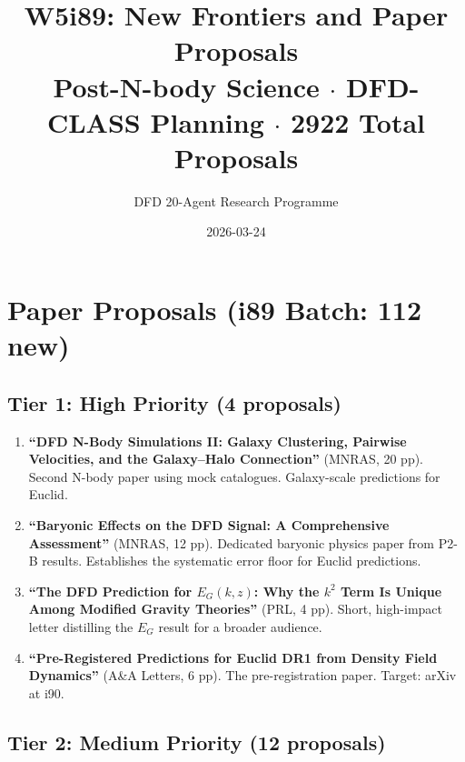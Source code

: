 \documentclass[11pt,a4paper]{article}
\title{W5i89: New Frontiers and Paper Proposals\\[6pt]
\large Post-N-body Science $\cdot$ DFD-CLASS Planning $\cdot$ 2922 Total Proposals}
\author{DFD 20-Agent Research Programme}
\date{2026-03-24}
\begin{document}
\maketitle

\section{Paper Proposals (i89 Batch: 112 new)}

\subsection{Tier 1: High Priority (4 proposals)}

\begin{enumerate}[nosep]
\item \textbf{``DFD N-Body Simulations II: Galaxy Clustering, Pairwise Velocities, and the Galaxy--Halo Connection''} (MNRAS, 20 pp). Second N-body paper using mock catalogues. Galaxy-scale predictions for Euclid.

\item \textbf{``Baryonic Effects on the DFD Signal: A Comprehensive Assessment''} (MNRAS, 12 pp). Dedicated baryonic physics paper from P2-B results. Establishes the systematic error floor for Euclid predictions.

\item \textbf{``The DFD Prediction for $E_G(k,z)$: Why the $k^2$ Term Is Unique Among Modified Gravity Theories''} (PRL, 4 pp). Short, high-impact letter distilling the $E_G$ result for a broader audience.

\item \textbf{``Pre-Registered Predictions for Euclid DR1 from Density Field Dynamics''} (A\&A Letters, 6 pp). The pre-registration paper. Target: arXiv at i90.
\end{enumerate}

\subsection{Tier 2: Medium Priority (12 proposals)}
\end{document}

